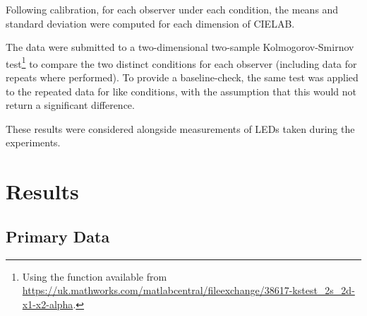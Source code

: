 Following calibration, for each observer under each condition, the means and standard deviation were computed for each dimension of CIELAB. 

The data were submitted to a two-dimensional two-sample Kolmogorov-Smirnov test\footnote{Using the function available from \url{https://uk.mathworks.com/matlabcentral/fileexchange/38617-kstest_2s_2d-x1-x2-alpha}.} to compare the two distinct conditions for each observer (including data for repeats where performed). To provide a baseline-check, the same test was applied to the repeated data for like conditions, with the assumption that this would not return a significant difference.

These results were considered alongside measurements of LEDs taken during the experiments.

\section{Results}

\subsection{Primary Data}

